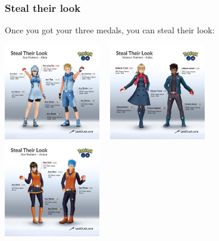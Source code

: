 \documentclass[8pt,aspectratio=169,compress]{beamer}
\begin{document}
\begin{frame}
\frametitle{Steal their look}

\begin{tiny}
\begin{block}{}
\begin{center}
Once you got your three medals, you can steal their look:

\vspace{0.2cm}

\includegraphics[width=4.2cm]{../../outfit/Alola_Ace_Trainer_2.jpg}~~
\includegraphics[width=4.2cm]{../../outfit/Kalos_Veteran_2.jpg}~~
\includegraphics[width=4.2cm]{../../outfit/Unova_Ace_Trainer_2.jpg}

\vspace{0.2cm}
\end{center}
\end{block}


\end{tiny}
\end{frame}
\end{document}
